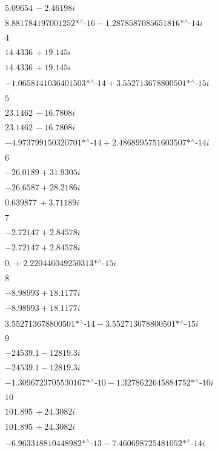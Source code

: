 \noindent\(5.09654\, -2.46198 i\)

\noindent\(\text{8.881784197001252$\grave{ }$*${}^{\wedge}$-16}-\text{1.2878587085651816$\grave{ }$*${}^{\wedge}$-14} i\)

\noindent\(4\)

\noindent\(14.4336\, +19.145 i\)

\noindent\(14.4336\, +19.145 i\)

\noindent\(-\text{1.0658141036401503$\grave{ }$*${}^{\wedge}$-14}+\text{3.552713678800501$\grave{ }$*${}^{\wedge}$-15} i\)

\noindent\(5\)

\noindent\(23.1462\, -16.7808 i\)

\noindent\(23.1462\, -16.7808 i\)

\noindent\(-\text{4.973799150320701$\grave{ }$*${}^{\wedge}$-14}+\text{2.4868995751603507$\grave{ }$*${}^{\wedge}$-14} i\)

\noindent\(6\)

\noindent\(-26.0189+31.9305 i\)

\noindent\(-26.6587+28.2186 i\)

\noindent\(0.639877\, +3.71189 i\)

\noindent\(7\)

\noindent\(-2.72147+2.84578 i\)

\noindent\(-2.72147+2.84578 i\)

\noindent\(0.\, +\text{2.220446049250313$\grave{ }$*${}^{\wedge}$-15} i\)

\noindent\(8\)

\noindent\(-8.98993+18.1177 i\)

\noindent\(-8.98993+18.1177 i\)

\noindent\(\text{3.552713678800501$\grave{ }$*${}^{\wedge}$-14}-\text{3.552713678800501$\grave{ }$*${}^{\wedge}$-15} i\)

\noindent\(9\)

\noindent\(-24539.1-12819.3 i\)

\noindent\(-24539.1-12819.3 i\)

\noindent\(-\text{1.3096723705530167$\grave{ }$*${}^{\wedge}$-10}-\text{1.3278622645884752$\grave{ }$*${}^{\wedge}$-10} i\)

\noindent\(10\)

\noindent\(101.895\, +24.3082 i\)

\noindent\(101.895\, +24.3082 i\)

\noindent\(-\text{6.963318810448982$\grave{ }$*${}^{\wedge}$-13}-\text{7.460698725481052$\grave{ }$*${}^{\wedge}$-14} i\)